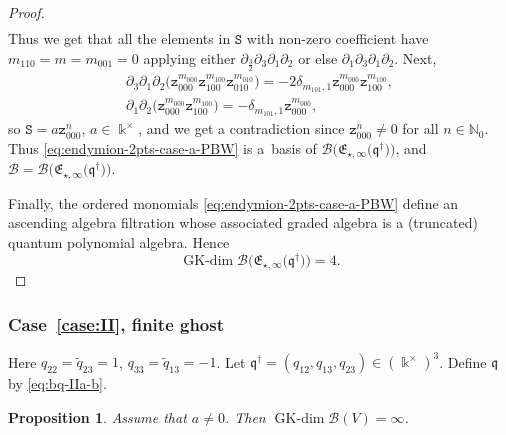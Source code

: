 \documentclass[10pt,a4paper]{amsart}
\numberwithin{equation}{section}
\newtheorem{Proposition}[Theorem]{Proposition}
 { \theoremstyle{definition}
\newtheorem{Definition}[Theorem]{Definition}
\newtheorem{Note}[Theorem]{Note}
\newtheorem{Example}[Theorem]{Example}
\newtheorem{Remark}[Theorem]{Remark} }
\newcommand{\GK}{\operatorname{GK-dim}}
\newcommand{\toba}{\mathscr B}
\newcommand{\zt}{\mathtt{z}}
\newcommand{\eny}{\mathfrak{E}}
\newcommand{\enyIIb}[1]{\eny_{\star,#1}}
\newcommand{\bq}{\mathfrak{q}}
\newcommand{\bqs}{\bq^{\dagger}}
\newcommand{\tresdos}{\frac{3}{2}}
\begin{document}
\begin{proof}
\begin{gather*}
\end{gather*}
Thus we get that all the elements in $\mathtt{S}$ with non-zero coefficient have $m_{110}=m=m_{001}=0$
applying either $\partial_{\tresdos}\partial_3\partial_1\partial_2$ or else $\partial_1\partial_3\partial_1\partial_2$. Next,
\begin{gather*}
 \partial_3\partial_1\partial_2\big(\zt_{000}^{m_{000}} \zt_{100}^{m_{100}} \zt_{010}^{m_{010}}\big)
=-2\delta_{m_{101},1} \zt_{000}^{m_{000}} \zt_{100}^{m_{100}},
\\[1mm]
 \partial_1\partial_2\big(\zt_{000}^{m_{000}} \zt_{100}^{m_{100}}\big)
=-\delta_{m_{101},1} \zt_{000}^{m_{000}},
\end{gather*}
so $\mathtt{S}=a \zt_{000}^n$, $a\in\Bbbk^{\times}$, and we get a contradiction since $\zt_{000}^n\ne0$ for all $n\in\mathbb N_0$. Thus \eqref{eq:endymion-2pts-case-a-PBW} is a~basis of $\toba\big(\enyIIb{\infty}\big(\bqs\big)\big)$, and $\toba=\toba\big(\enyIIb{\infty}\big(\bqs\big)\big)$.

Finally, the ordered monomials \eqref{eq:endymion-2pts-case-a-PBW} define an ascending algebra filtration whose associated graded algebra is a
(truncated) quantum polynomial algebra. Hence
\begin{equation*}
\GK \toba\big(\enyIIb{\infty}\big(\bqs\big)\big) =4.
\tag*{\qed}
\end{equation*}
\renewcommand{\qed}{}
\end{proof}

\subsubsection[Case (II), finite ghost]{Case~\ref{case:II}, finite ghost}\label{subsubsec:caseII-2}
Here
$q_{22} = \widetilde{q}_{23} = 1$, $q_{33} = \widetilde{q}_{13}=-1$.
Let $\bqs = (q_{12}, q_{13}, q_{23}) \in (\Bbbk^{\times})^3$. Define
$\bq$ by \eqref{eq:bq-IIa-b}.



\begin{Proposition} \label{prop:endymion-two-pts-case-b}
Assume that $a\ne 0$. Then $\GK \toba(V)=\infty$.
\end{Proposition}
\end{document}
